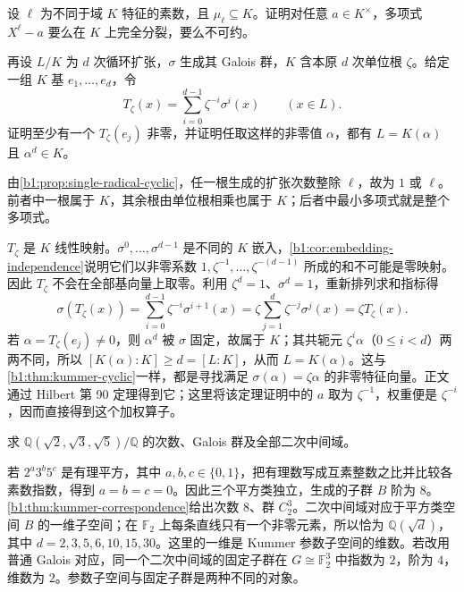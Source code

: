 \begin{exercise}\label{b1:ex:20-6}
	设 \(\ell\) 为不同于域 \(K\) 特征的素数，且 \(\mu_\ell\subseteq K\)。证明对任意 \(a\in K^\times\)，多项式 \(X^\ell-a\) 要么在 \(K\) 上完全分裂，要么不可约。

	再设 \(L/K\) 为 \(d\) 次循环扩张，\(\sigma\) 生成其 Galois 群，\(K\) 含本原 \(d\) 次单位根 \(\zeta\)。给定一组 \(K\) 基 \(e_1,\ldots,e_d\)，令
	\[
		T_\zeta(x)=\sum_{i=0}^{d-1}\zeta^{-i}\sigma^i(x)\qquad(x\in L).
	\]
	证明至少有一个 \(T_\zeta(e_j)\) 非零，并证明任取这样的非零值 \(\alpha\)，都有 \(L=K(\alpha)\) 且 \(\alpha^d\in K\)。
\end{exercise}
\begin{solution}
	由\cref{b1:prop:single-radical-cyclic}，任一根生成的扩张次数整除 \(\ell\)，故为 \(1\) 或 \(\ell\)。前者中一根属于 \(K\)，其余根由单位根相乘也属于 \(K\)；后者中最小多项式就是整个多项式。

	\(T_\zeta\) 是 \(K\) 线性映射。\(\sigma^0,\ldots,\sigma^{d-1}\) 是不同的 \(K\) 嵌入，\cref{b1:cor:embedding-independence}说明它们以非零系数 \(1,\zeta^{-1},\ldots,\zeta^{-(d-1)}\) 所成的和不可能是零映射。因此 \(T_\zeta\) 不会在全部基向量上取零。利用 \(\zeta^d=1\)、\(\sigma^d=1\)，重新排列求和指标得
	\[
		\sigma(T_\zeta(x)) =\sum_{i=0}^{d-1}\zeta^{-i}\sigma^{i+1}(x) =\zeta\sum_{j=1}^{d}\zeta^{-j}\sigma^j(x) =\zeta T_\zeta(x).
	\]
	若 \(\alpha=T_\zeta(e_j)\ne0\)，则 \(\alpha^d\) 被 \(\sigma\) 固定，故属于 \(K\)；其共轭元 \(\zeta^i\alpha\)（\(0\leq i<d\)）两两不同，所以 \([K(\alpha):K]\geq d=[L:K]\)，从而 \(L=K(\alpha)\)。这与\cref{b1:thm:kummer-cyclic}一样，都是寻找满足 \(\sigma(\alpha)=\zeta\alpha\) 的非零特征向量。正文通过 Hilbert 第 90 定理得到它；这里将该定理证明中的 \(a\) 取为 \(\zeta^{-1}\)，权重便是 \(\zeta^{-i}\)，因而直接得到这个加权算子。
\end{solution}

\begin{exercise}\label{b1:ex:20-7}
	求 \(\mathbb Q(\sqrt2,\sqrt3,\sqrt5)/\mathbb Q\) 的次数、Galois 群及全部二次中间域。
\end{exercise}
\begin{solution}
	若 \(2^a3^b5^c\) 是有理平方，其中 \(a,b,c\in\{0,1\}\)，把有理数写成互素整数之比并比较各素数指数，得到 \(a=b=c=0\)。因此三个平方类独立，生成的子群 \(B\) 阶为 \(8\)。\cref{b1:thm:kummer-correspondence}给出次数 \(8\)、群 \(C_2^3\)。二次中间域对应于平方类空间 \(B\) 的一维子空间；在 \(\mathbb F_2\) 上每条直线只有一个非零元素，所以恰为 \(\mathbb Q(\sqrt d)\)，其中 \(d=2,3,5,6,10,15,30\)。这里的一维是 Kummer 参数子空间的维数。若改用普通 Galois 对应，同一个二次中间域的固定子群在 \(G\cong\mathbb F_2^3\) 中指数为 \(2\)，阶为 \(4\)，维数为 \(2\)。参数子空间与固定子群是两种不同的对象。
\end{solution}

